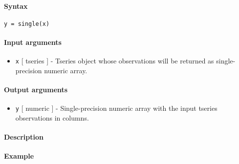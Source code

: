 


	\paragraph{Syntax}

\begin{verbatim}
y = single(x)
\end{verbatim}

\paragraph{Input arguments}

\begin{itemize}
\itemsep1pt\parskip0pt
\item
  \texttt{x} {[} tseries {]} - Tseries object whose observations will be
  returned as single-precision numeric array.
\end{itemize}

\paragraph{Output arguments}

\begin{itemize}
\itemsep1pt\parskip0pt
\item
  \texttt{y} {[} numeric {]} - Single-precision numeric array with the
  input tseries observations in columns.
\end{itemize}

\paragraph{Description}

\paragraph{Example}


